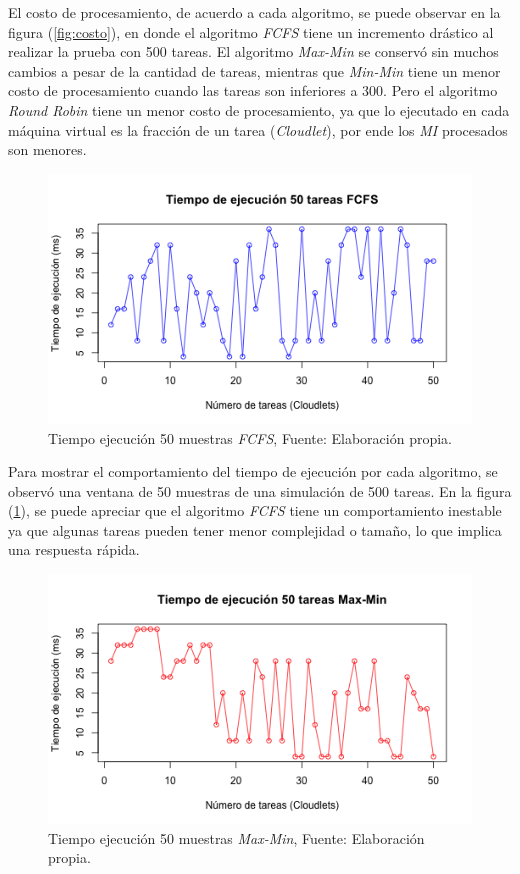 \documentclass[jou,apacite]{apa6}
\begin{document}
El costo de procesamiento, de acuerdo a cada algoritmo, se puede observar en la figura (\ref{fig:costo}), en donde el algoritmo \textit{FCFS} tiene un incremento dr\'astico al realizar la prueba con 500 tareas. El algoritmo \textit{Max-Min} se conserv\'o sin muchos cambios a pesar de la cantidad de tareas, mientras que \textit{Min-Min} tiene un menor costo de procesamiento cuando las tareas son inferiores a 300. Pero el algoritmo \textit{Round Robin} tiene un menor costo de procesamiento, ya que lo ejecutado en cada máquina virtual es la fracción de un tarea (\textit{Cloudlet}), por ende los \textit{MI} procesados son menores.
\label{etiqueta2}

\renewcommand\thefigure{\arabic{figure}}
\begin{figure}[h!] 
	\centering
	\includegraphics[scale=0.5]{media/fcfs}
	\caption{Tiempo ejecuci\'on 50 muestras \textit{FCFS}, Fuente: Elaboraci\'on propia.}
	\label{fig:ejecucion}
\end{figure}


Para mostrar el comportamiento del tiempo de ejecuci\'on por cada algoritmo, se observó una ventana de 50 muestras de una simulaci\'on de 500 tareas. En la figura (\ref{fig:ejecucion}), se puede apreciar que el algoritmo \textit{FCFS} tiene un comportamiento inestable ya que algunas tareas pueden tener menor complejidad o tamaño, lo que implica una respuesta r\'apida.

\renewcommand\thefigure{\arabic{figure}}
\begin{figure}[h!] 
	\centering
	\includegraphics[scale=0.5]{media/maxmin}
	\caption{Tiempo ejecuci\'on 50 muestras \textit{Max-Min}, Fuente: Elaboraci\'on propia.}
	\label{fig:maxmin}
\end{figure}
\end{document}
